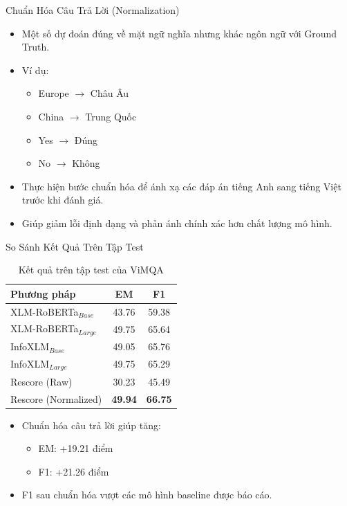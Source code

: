 \documentclass{beamer}
\begin{document}
\begin{frame}{Chuẩn Hóa Câu Trả Lời (Normalization)}

\begin{itemize}
    \item Một số dự đoán đúng về mặt ngữ nghĩa nhưng khác ngôn ngữ với Ground Truth.
    
    \item Ví dụ:
    \begin{itemize}
        \item Europe $\rightarrow$ Châu Âu
        \item China $\rightarrow$ Trung Quốc
        \item Yes $\rightarrow$ Đúng
        \item No $\rightarrow$ Không
    \end{itemize}

    \item Thực hiện bước chuẩn hóa để ánh xạ các đáp án tiếng Anh sang tiếng Việt trước khi đánh giá.

    \item Giúp giảm lỗi định dạng và phản ánh chính xác hơn chất lượng mô hình.
\end{itemize}

\end{frame}
\begin{frame}{So Sánh Kết Quả Trên Tập Test}

\begin{table}[h]
\centering
\small
\begin{tabular}{lcc}
\hline
\textbf{Phương pháp} & \textbf{EM} & \textbf{F1} \\
\hline
XLM-RoBERTa$_{Base}$      & 43.76 & 59.38 \\
XLM-RoBERTa$_{Large}$     & 49.75 & 65.64 \\
InfoXLM$_{Base}$          & 49.05 & 65.76 \\
InfoXLM$_{Large}$         & 49.75 & 65.29 \\
\hline
Rescore (Raw)             & 30.23 & 45.49 \\
Rescore (Normalized)      & \textbf{49.94} & \textbf{66.75} \\
\hline
\end{tabular}
\caption{Kết quả trên tập test của ViMQA}
\end{table}

\vspace{0.3cm}

\begin{itemize}
    \item Chuẩn hóa câu trả lời giúp tăng:
    \begin{itemize}
        \item EM: +19.21 điểm
        \item F1: +21.26 điểm
    \end{itemize}
    \item F1 sau chuẩn hóa vượt các mô hình baseline được báo cáo.
\end{itemize}

\end{frame}
\end{document}
